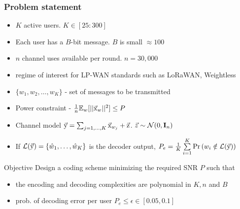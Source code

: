 \begin{frame}\frametitle{Problem statement}
  \begin{itemize}
  \setlength{\itemsep}{3pt}
  \item $K$ active users. $K\in[25:300]$
  \item Each user has a $B$-bit message. $B$ is small $\approx 100$
  \item $n$ channel uses available per round. $n=30,000$ 
  \item {\small regime of interest for LP-WAN standards such as LoRaWAN, Weightless}
\end{itemize}
  \pause
  \vspace{2ex}

  \begin{itemize}
  \item $\{w_1,w_2,\ldots,w_K\}$ - set of messages to be transmitted
  \vspace{2.5pt}
  \item Power constraint -$~\frac{1}{n}\mathbb{E}_w[||\vec{\mathrm{x}}_w||^2]\leq P$
  \vspace{2.5pt}
  \item Channel model $\vec{\mathrm{y}}=\sum_{j=1,\ldots,K}\vec{\mathrm{x}}_{w_j}+\vec{\mathrm{z}}$. $\vec{z}\sim\mathcal{N}(0,\mathbf{I}_n)$
  \item If $\mathcal{L}(\vec{\mathrm{y}})=\{\hat{w}_1,\ldots,\hat{w}_K\}$ is the decoder output, $P_e=\frac{1}{K}\sum\limits_{i=1}^{K} \Pr\left( w_i \notin \mathcal{L}(\vec{\mathrm{y}}) \right) $
  \end{itemize}
      \pause
      \vspace{3ex}
  \begin{block}{Objective}
 Design a coding scheme minimizing the required SNR $P$ such that 
 \begin{itemize}
 \item the encoding and decoding complexities are polynomial in $K,n$ and $B$
 \item prob. of decoding error per user $P_e\leq \epsilon\in [0.05,0.1]$
\end{itemize} 
  \end{block}
 
\end{frame}

